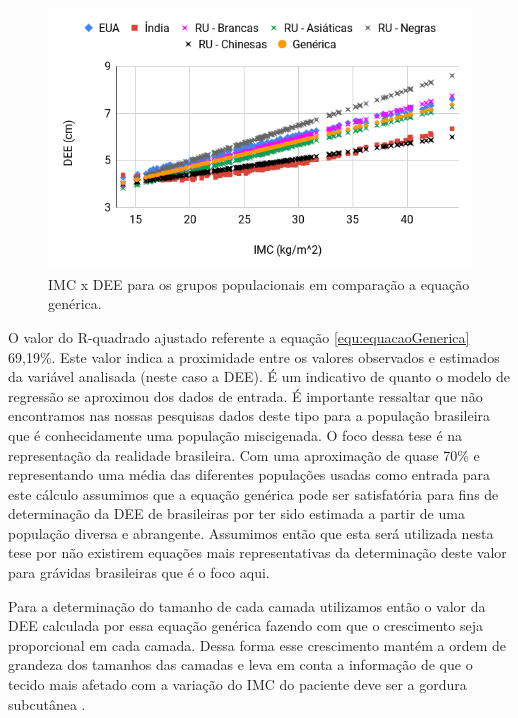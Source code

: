 \begin{figure}[ht!]
    \centering
    \includegraphics[width=0.9\linewidth]{capitulos/figuras/IMC versus DEE grupos populacionais e Equacao Generica.png} 
    \caption{\acrshort{IMC} x \acrshort{DEE} para os grupos populacionais em comparação a equação genérica.}
    \label{fig:imcDEEPopulacoesComparativoEquacaoGenerica}
\end{figure}

O valor do R-quadrado ajustado referente a equação \ref{equ:equacaoGenerica} 69,19\%. Este valor indica a proximidade entre os valores observados e estimados da variável analisada (neste caso a \acrshort{DEE}). É um indicativo de quanto o modelo de regressão se aproximou dos dados de entrada. É importante ressaltar que não encontramos nas nossas pesquisas dados deste tipo para a população brasileira que é conhecidamente uma população miscigenada. O foco dessa tese é na representação da realidade brasileira. Com uma aproximação de quase 70\% e representando uma média das diferentes populações usadas como entrada para este cálculo assumimos que a equação genérica pode ser satisfatória para fins de determinação da \acrshort{DEE} de brasileiras por ter sido estimada a partir de uma população diversa e abrangente. Assumimos então que esta será utilizada nesta tese por não existirem equações mais representativas da determinação deste valor para grávidas brasileiras que é o foco aqui.

Para a determinação do tamanho de cada camada utilizamos então o valor da \acrshort{DEE} calculada por essa equação genérica fazendo com que o crescimento seja proporcional em cada camada. Dessa forma esse crescimento mantém a ordem de grandeza dos tamanhos das camadas e leva em conta a informação de que o tecido mais afetado com a variação do \acrshort{IMC} do paciente deve ser a gordura subcutânea \cite{Palmer1983}.

